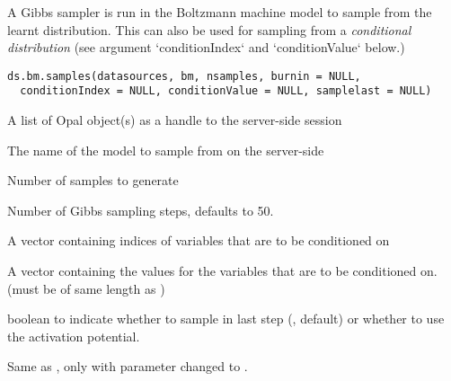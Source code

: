 %
\begin{Description}\relax
A Gibbs sampler is run in the Boltzmann machine model to sample from the learnt
distribution. This can also be used for sampling from a
\emph{conditional distribution}
(see argument `conditionIndex` and `conditionValue` below.)
\end{Description}
%
\begin{Usage}
\begin{verbatim}
ds.bm.samples(datasources, bm, nsamples, burnin = NULL,
  conditionIndex = NULL, conditionValue = NULL, samplelast = NULL)
\end{verbatim}
\end{Usage}
%
\begin{Arguments}
\begin{ldescription}
\item[\code{datasources}] A list of Opal object(s) as a handle to the server-side session

\item[\code{bm}] The name of the model to sample from on the server-side

\item[\code{nsamples}] Number of samples to generate

\item[\code{burnin}] Number of Gibbs sampling steps, defaults to 50.

\item[\code{conditionIndex}] A vector containing indices of variables that are to be conditioned on

\item[\code{conditionValue}] A vector containing the values for the variables that are to be conditioned on.
(must be of same length as )

\item[\code{samplelast}] boolean to indicate whether to sample in last step (, default)
or whether to use the activation potential.
\end{ldescription}
\end{Arguments}
%
\begin{Description}\relax
Same as , only with parameter  changed to .
\end{Description}
